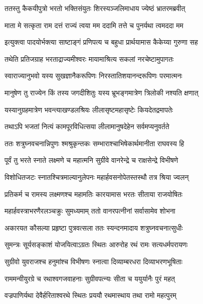 

\twolineshloka
{ततस्तु कैकयीपुत्रो भरतो भक्तिसंयुतः}
{शिरस्यञ्जलिमाधाय ज्येष्ठं भ्रातरमब्रवीत्} %

\twolineshloka
{माता मे सत्कृता राम दत्तं राज्यं त्वया मम}
{ददामि तत्ते च पुनर्यथा त्वमददा मम} %

\twolineshloka
{इत्युक्त्वा पादयोर्भक्त्या साष्टाङ्गं प्रणिपत्य च}
{बहुधा प्रार्थयामास कैकेय्या गुरुणा सह} %

\twolineshloka
{तथेति प्रतिजग्राह भरताद्राज्यमीश्वरः}
{मायामाश्रित्य सकलां नरचेष्टामुपागतः} %

\twolineshloka
{स्वाराज्यानुभवो यस्य सुखज्ञानैकरूपिणः}
{निरस्तातिशयानन्दरूपिणः परमात्मनः} %

\twolineshloka
{मानुषेण तु राज्येन किं तस्य जगदीशितुः}
{यस्य भ्रूभङ्गमात्रेण त्रिलोकी नश्यति क्षणात्} %

\twolineshloka
{यस्यानुग्रहमात्रेण भवन्त्याखण्डलश्रियः}
{लीलासृष्टमहासृष्टेः कियदेतद्रमापतेः} %

\twolineshloka
{तथाऽपि भजतां नित्यं कामपूरविधित्सया}
{लीलामानुषदेहेन सर्वमप्यनुवर्तते} %

\twolineshloka
{ततः शत्रुघ्नवचनान्निपुणः श्मश्रुकृन्तकः}
{सम्भाराश्चाभिषेकार्थमानीता राघवस्य हि} %

\twolineshloka
{पूर्वं तु भरते स्नाते लक्ष्मणे च महात्मनि}
{सुग्रीवे वानरेन्द्रे च राक्षसेन्द्रे विभीषणे} %

\twolineshloka
{विशोधितजटः स्नातश्चित्रमाल्यानुलेपनः}
{महार्हवसनोपेतस्तस्थौ तत्र श्रिया ज्वलन्} %

\twolineshloka
{प्रतिकर्म च रामस्य लक्ष्मणश्च महामतिः}
{कारयामास भरतः सीताया राजयोषितः} %

\twolineshloka
{महार्हवस्त्राभरणैरलञ्चक्रुः सुमध्यमाम्}
{ततो वानरपत्नीनां सर्वासामेव शोभना} %

\twolineshloka
{अकारयत कौसल्या प्रहृष्टा पुत्रवत्सला}
{ततः स्यन्दनमादाय शत्रुघ्नवचनात्सुधीः} %

\twolineshloka
{सुमन्त्रः सूर्यसङ्काशं योजयित्वाऽग्रतः स्थितः}
{आरुरोह रथं रामः सत्यधर्मपरायणः} %

\twolineshloka
{सुग्रीवो युवराजश्च हनुमांश्च विभीषणः}
{स्नात्वा दिव्याम्बरधरा दिव्याभरणभूषिताः} %

\twolineshloka
{राममन्वीयुरग्रे च रथाश्वगजवाहनाः}
{सुग्रीवपत्न्यः सीता च ययुर्यानैः पुरं महत्} %

\twolineshloka
{वज्रपाणिर्यथा देवैर्हरिताश्वरथे स्थितः}
{प्रययौ रथमास्थाय तथा रामो महत्पुरम्} %

